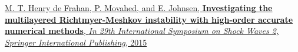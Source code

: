 \documentclass[11pt,letterpaper]{article}
\newcommand{\raisedrule}[2][0em]{\leaders\hbox{\rule[#1]{1pt}{#2}}\hfill}
\newcommand*{\sectionfont}{\Large\sffamily\mdseries\upshape}
\begin{document}
\href{https://books.google.com/books?id=6GgnCgAAQBAJ&pg=PA1095&lr=&source=gbs_selected_pages&cad=2#v=onepage&q&f=false}{M. T. Henry de Frahan, P. Movahed, and E. Johnsen, \textbf{Investigating the multilayered Richtmyer-Meshkov instability with high-order accurate numerical methods}, \textit{In 29th International Symposium on Shock Waves 2, Springer International Publishing}, 2015}\\[3ex]%
%
%
%
%
\end{document}
